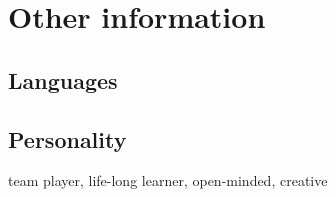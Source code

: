 \documentclass[letterpaper]{cv} %
\begin{document}

\section{Other information}

\subsection{Languages}
\begin{twentyshort} %
\end{twentyshort}

\subsection{Personality}
team player, life-long learner, open-minded, creative



%



\end{document}
